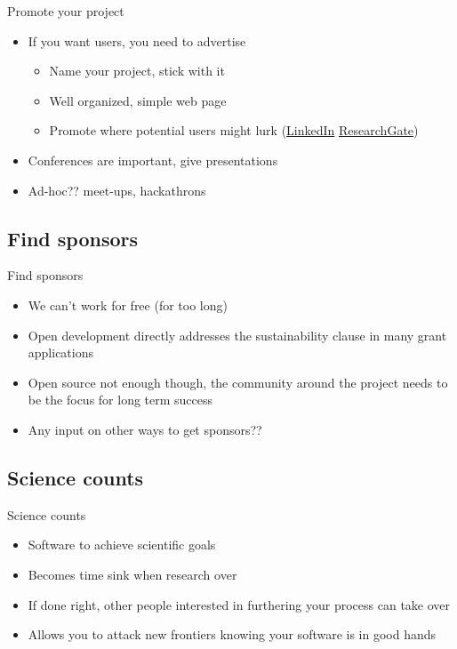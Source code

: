 \documentclass{beamer}
\begin{document}
\begin{frame}{Promote your project}
\begin{itemize}
\item If you want users, you need to advertise
\begin{itemize}
\item Name your project, stick with it
\item Well organized, simple web page
\item Promote where potential users might lurk (\href{https://linkedin.com}{LinkedIn} \href{https://researchgate.net}{ResearchGate})
\end{itemize}
\item Conferences are important, give presentations
\item Ad-hoc?? meet-ups, hackathrons
\end{itemize}
\end{frame}

\subsection{Find sponsors}

\begin{frame}{Find sponsors}
\begin{itemize}
\item We can't work for free (for too long)
\item Open development directly addresses the sustainability clause in many grant applications
\item Open source not enough though, the community around the project needs to be the focus for long term success
\item Any input on other ways to get sponsors??
\end{itemize}
\end{frame}

\subsection{Science counts}

\begin{frame}{Science counts}
\begin{itemize}
\item Software to achieve scientific goals
\item Becomes time sink when research over
\item If done right, other people interested in furthering your process can take over
\item Allows you to attack new frontiers knowing your software is in good hands
\end{itemize}
\end{frame}
\end{document}
